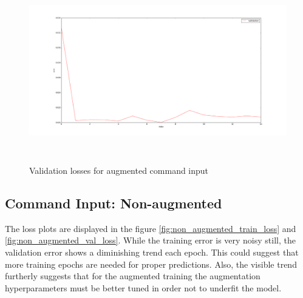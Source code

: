 \documentclass[a4paper]{article}
\begin{document}
  \begin{figure}[H]
    \centering
    \includegraphics[width=\textwidth, height=8cm]{../pics/command_input_validation_augmented.png}
    
    \caption{Validation losses for augmented command input}
    \label{fig:augmented_command_eval_loss}
  \end{figure}


  \subsection{Command Input: Non-augmented}
  The loss plots are displayed in the figure \ref{fig:non_augmented_train_loss}
  and \ref{fig:non_augmented_val_loss}. While the training error is very noisy
  still, the validation error shows a diminishing trend each epoch. This could
  suggest that more training epochs are needed for proper predictions. Also, the
  visible trend furtherly suggests that for the augmented training the
  augmentation hyperparameters must be better tuned in order not to underfit the
  model.
\end{document}
